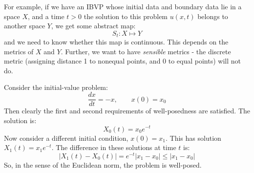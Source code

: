 \documentclass[../Main.tex]{subfiles}
\begin{document}
For example, if we have an IBVP whose initial data and boundary data lie in a space $X$, and a time $t > 0$ the solution to this problem $u(x, t)$ belongs to another space $Y$, we get some abstract map:
\begin{equation*}
    S_t : X \mapsto Y
\end{equation*}
and we need to know whether this map is continuous. This depends on the metrics of $X$ and $Y$. Further, we want to have \textit{sensible} metrics - the discrete metric (assigning distance 1 to nonequal points, and 0 to equal points) will not do.
\begin{example}
    Consider the initial-value problem:
    \begin{equation*}
        \frac{dx}{dt} = -x,\qquad x(0) = x_0
    \end{equation*}
    Then clearly the first and second requirements of well-posedness are satisfied. The solution is:
    \begin{equation*}
        X_0(t) = x_0 e^{-t}
    \end{equation*}
    Now consider a different initial condition, $x(0) = x_1$. This has solution $X_1(t) = x_1 e^{-t}$. The difference in these solutions at time $t$ is:
    \begin{equation*}
        |X_1(t) - X_0(t)| = e^{-t}|x_1 - x_0| \leq |x_1 - x_0|
    \end{equation*}
    So, in the sense of the Euclidean norm, the problem is well-posed.
\end{example}
\end{document}

